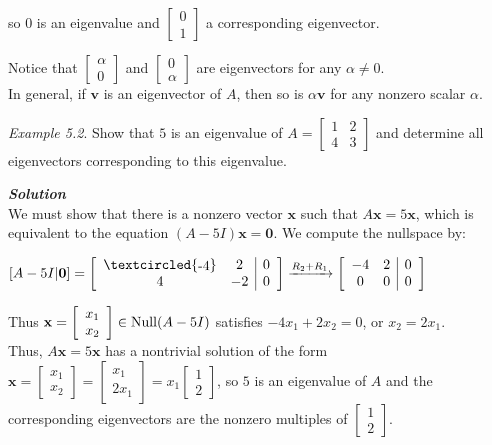 \documentclass[
  letterpaper,
  DIV=11,
  numbers=noendperiod]{scrartcl}
\theoremstyle{remark}
\begin{document}
so \(0\) is an eigenvalue and
\(\left[\begin{array}{c} 0 \\ 1 \end{array}\right]\) a corresponding
eigenvector.

Notice that \(\left[\begin{array}{c} \alpha \\ 0 \end{array}\right]\)
and \(\left[\begin{array}{c} 0 \\ \alpha \end{array}\right]\) are
eigenvectors for any \(\alpha \neq 0\).\\
In general, if \(\mathbf{v}\) is an eigenvector of \(A\), then so is
\(\alpha \mathbf{v}\) for any nonzero scalar \(\alpha\).

\emph{Example 5.2}. Show that \(5\) is an eigenvalue of
\(A = \left[\begin{array}{cc} 1 & 2 \\ 4 & 3 \end{array}\right]\) and
determine all eigenvectors corresponding to this eigenvalue.

\textbf{\emph{Solution}}\\
We must show that there is a nonzero vector \(\mathbf{x}\) such that
\(A\mathbf{x} = 5\mathbf{x}\), which is equivalent to the equation
\((A - 5I)\mathbf{x} = \mathbf{0}\). We compute the nullspace by:

\(\left[A - 5I | \mathbf{0}\right] = \left[\begin{array}{cc|c} \textcircled{\raisebox{-0.9pt}{-4}} & 2 & 0 \\ 4 & -2 & 0 \end{array}\right] \xrightarrow{R_{2} + R_{1}} \left[\begin{array}{cc|c} -4 & 2 & 0 \\ 0 & 0 & 0 \end{array}\right]\)

Thus
\(\mathbf{x} = \left[\begin{array}{c} x_{1} \\ x_{2} \end{array}\right] \in {\rm Null}(A-5I)\)
satisfies \(-4x_{1} + 2x_{2} = 0\), or \(x_{2} = 2x_{1}\).\\
Thus, \(A\mathbf{x} = 5\mathbf{x}\) has a nontrivial solution of the
form
\(\mathbf{x} = \left[\begin{array}{c} x_{1} \\ x_{2} \end{array}\right] = \left[\begin{array}{c} x_{1} \\ 2x_{1} \end{array}\right] = x_{1}\left[\begin{array}{c} 1 \\ 2 \end{array}\right]\),
so \(5\) is an eigenvalue of \(A\) and the corresponding eigenvectors
are the nonzero multiples of
\(\left[\begin{array}{c} 1 \\ 2 \end{array}\right]\).
\end{document}
